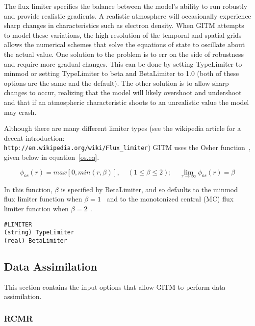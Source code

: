The flux limiter specifies the balance between the model's ability to run robustly and provide realistic gradients.  A realistic atmosphere will occasionally experience sharp changes in characteristics such as electron density.  When GITM attempts to model these variations, the high resolution of the temporal and spatial grids allows the numerical schemes that solve the equations of state to oscillate about the actual value.  One solution to the problem is to err on the side of robustness and require more gradual changes.  This can be done by setting TypeLimiter to minmod or setting TypeLimiter to beta and BetaLimiter to 1.0 (both of these options are the same and the default).  The other solution is to allow sharp changes to occur, realizing that the model will likely overshoot and undershoot and that if an atmospheric characteristic shoots to an unrealistic value the model may crash.

Although there are many different limiter types (see the wikipedia article for a decent introduction: {\tt \\http://en.wikipedia.org/wiki/Flux\_limiter}) GITM uses the Osher function~\citep{Chakravarthy:1983os}, given below in equation~\ref{os.eq}.

\begin{equation}
\label{os.eq}
\phi_{os}(r) = max[0,min(r,\beta)], \;\;\;\; (1 \le \beta \le 2); \;\;\;\; \lim_{r\to\infty} \phi_{os}(r) = \beta
\end{equation}

In this function, $\beta$ is specified by BetaLimiter, and so defaults to the minmod flux limiter function when $\beta = 1$~\citep{roe:1986aa} and to the monotonized central (MC) flux limiter function when $\beta = 2$~\citep{valLeer:1977aa}.

\begin{verbatim}
#LIMITER
(string) TypeLimiter
(real) BetaLimiter
\end{verbatim}

\subsection{Data Assimilation}
\label{assim.sec}

This section contains the input options that allow GITM to perform data assimilation.

\subsubsection{RCMR}
\label{rcmr.sec}

